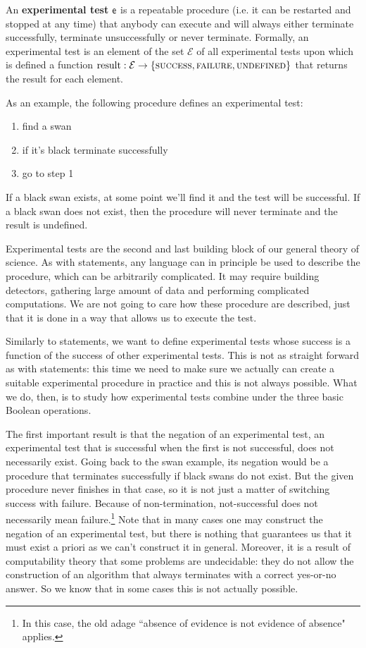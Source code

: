 \documentclass[11pt,letterpaper,fleqn]{memoir} %
\begin{document}
\begin{mathSection}
\begin{axiom}\label{def_experimental_tests}
	An \textbf{experimental test} $\mathsf{e}$ is a repeatable procedure (i.e. it can be restarted and stopped at any time) that anybody can execute and will always either terminate successfully, terminate unsuccessfully or never terminate. Formally, an experimental test is an element of the set $\mathcal{E}$ of all experimental tests upon which is defined a function $\operatorname{result}: \mathcal{E} \to \{\textsc{success}, \textsc{failure}, \textsc{undefined}\}$ that returns the result for each element.
\end{axiom}
\end{mathSection}

As an example, the following procedure defines an experimental test:
\begin{enumerate}
	\item find a swan
	\item if it's black terminate successfully
	\item go to step 1
\end{enumerate}
If a black swan exists, at some point we'll find it and the test will be successful. If a black swan does not exist, then the procedure will never terminate and the result is undefined.

Experimental tests are the second and last building block of our general theory of science. As with statements, any language can in principle be used to describe the procedure, which can be arbitrarily complicated. It may require building detectors, gathering large amount of data and performing complicated computations. We are not going to care how these procedure are described, just that it is done in a way that allows us to execute the test.

Similarly to statements, we want to define experimental tests whose success is a function of the success of other experimental tests. This is not as straight forward as with statements: this time we need to make sure we actually can create a suitable experimental procedure in practice and this is not always possible. What we do, then, is to study how experimental tests combine under the three basic Boolean operations.

The first important result is that the negation of an experimental test, an experimental test that is successful when the first is not successful, does not necessarily exist. Going back to the swan example, its negation would be a procedure that terminates successfully if black swans do not exist. But the given procedure never finishes in that case, so it is not just a matter of switching success with failure. Because of non-termination, not-successful does not necessarily mean failure.\footnote{In this case, the old adage ``absence of evidence is not evidence of absence" applies.} Note that in many cases one may construct the negation of an experimental test, but there is nothing that guarantees us that it must exist a priori as we can't construct it in general. Moreover, it is a result of computability theory that some problems are undecidable: they do not allow the construction of an algorithm that always terminates with a correct yes-or-no answer. So we know that in some cases this is not actually possible.
\end{document}

